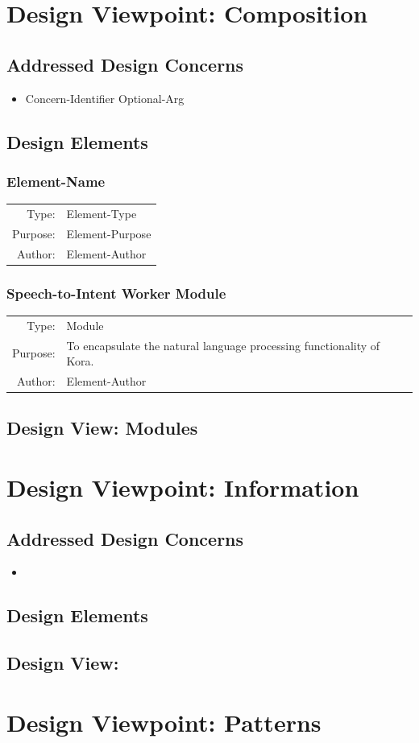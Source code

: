 \documentclass[onecolumn, draftclsnofoot,10pt, compsoc]{IEEEtran}
\def \botname{Kora\xspace}
\newcommand{\designConcernRef}[2][]{
    #2 #1
}
\newcommand{\designElementDef}[4]{
    \subsubsection{#1}
    \begin{tabular}[t]{r p{6in}}
        Type: & #2 \\
        Purpose: & #3 \\
        Author: & #4 \\
    \end{tabular}
}
\begin{document}
\section{Design Viewpoint: Composition}
    \subsection{Addressed Design Concerns}
        \begin{itemize}
            \item \designConcernRef[Optional-Arg]{Concern-Identifier}
        \end{itemize}

    \subsection{Design Elements} 
        \designElementDef{Element-Name}{Element-Type}{Element-Purpose}{Element-Author}
        \designElementDef{Speech-to-Intent Worker Module}
                         {Module}
                         {To encapsulate the natural language processing functionality of \botname.}
                         {Element-Author}
    \subsection{Design View: Modules}


\section{Design Viewpoint: Information}
    \subsection{Addressed Design Concerns}
        \begin{itemize}
            \item
        \end{itemize}

    \subsection{Design Elements} 

    \subsection{Design View: }


\section{Design Viewpoint: Patterns}
\end{document}
